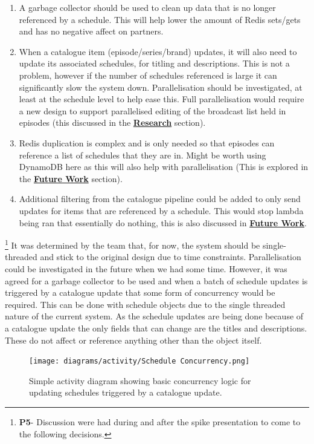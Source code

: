   \begin{enumerate}
    \item A garbage collector should be used to clean up data that is no longer referenced by a schedule. This will help lower the amount of Redis sets/gets
    and has no negative affect on partners.
    \item When a catalogue item (episode/series/brand) updates, it will also need to update its associated schedules, for titling and descriptions. This 
    is not a problem, however if the number of schedules referenced is large it can significantly slow the system down. Parallelisation should be 
    investigated, at least at the schedule level to help ease this. Full parallelisation would require a new design to support parallelised editing of the 
    broadcast list held in episodes (this discussed in the \hyperref[sec:storageSolutions]{\textbf{Research}} section).
    \item Redis duplication is complex and is only needed so that episodes can reference a list of schedules that they are in. Might be worth using 
    DynamoDB here as this will also help with parallelisation (This is explored in the \hyperref[sec:future]{\textbf{Future Work}} section).
    \item Additional filtering from the catalogue pipeline could be added to only send updates for items that are referenced by a schedule. This would 
    stop lambda being ran that essentially do nothing, this is also discussed in \hyperref[sec:future]{\textbf{Future Work}}.
  \end{enumerate}

  \footnote{\textbf{P5}- Discussion were had during and after the spike presentation to come to the following decisions.}
  It was determined by the team that, for now, the system should be single-threaded and stick to the original design due to time constraints.
  Parallelisation could be investigated in the future when we had some time. However, it was agreed for a garbage collector to be used and 
  when a batch of schedule updates is triggered by a catalogue update that some form of concurrency would be required. This can be done with schedule
  objects due to the single threaded nature of the current system. As the schedule updates are being done because of a catalogue update the only 
  fields that can change are the titles and descriptions. These do not affect or reference anything other than the object itself.

  \begin{figure}[H]
    \centering
    \texttt{[image: diagrams/activity/Schedule Concurrency.png]}
    \caption{Simple activity diagram showing basic concurrency logic for updating schedules triggered by a catalogue update.}
    \label{fig:scheduleConcurrency}
  \end{figure}

\newpage